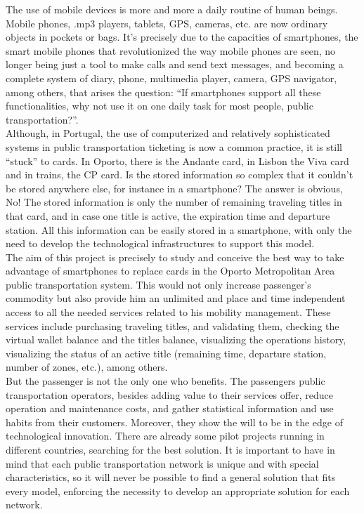 The use of mobile devices is more and more a daily routine of human beings. Mobile phones, .mp3 players, tablets, GPS, cameras, etc. are now ordinary objects in pockets or bags. It's precisely due to the capacities of smartphones, the smart mobile phones that revolutionized the way mobile phones are seen, no longer being just a tool to make calls and send text messages, and becoming a complete system of diary, phone, multimedia player, camera, GPS navigator, among others, that arises the question: “If smartphones support all these functionalities, why not use it on one daily task for most people, public transportation?”.
\\Although, in Portugal, the use of computerized and relatively sophisticated systems in public transportation ticketing is now a common practice, it is still “stuck” to cards. In Oporto, there is the Andante card, in Lisbon the Viva card and in trains, the CP card. Is the stored information so complex that it couldn’t be stored anywhere else, for instance in a smartphone? The answer is obvious, No! The stored information is only the number of remaining traveling titles in that card, and in case one title is active, the expiration time and departure station. All this information can be easily stored in a smartphone, with only the need to develop the technological infrastructures to support this model.
\\The aim of this project is precisely to study and conceive the best way to take advantage of smartphones to replace cards in the Oporto Metropolitan Area public transportation system. This would not only increase passenger’s commodity but also provide him an unlimited and place and time independent access to all the needed services related to his mobility management. These services include purchasing traveling titles, and validating them, checking the virtual wallet balance and the titles balance, visualizing the operations history, visualizing the status of an active title (remaining time, departure station, number of zones, etc.), among others.
\\But the passenger is not the only one who benefits. The passengers public transportation operators, besides adding value to their services offer, reduce operation and maintenance costs, and gather statistical information and use habits from their customers. Moreover, they show the will to be in the edge of technological innovation. There are already some pilot projects running in different countries, searching for the best solution. It is important to have in mind that each public transportation network is unique and with special characteristics, so it will never be possible to find a general solution that fits every model, enforcing the necessity to develop an appropriate solution for each network.
